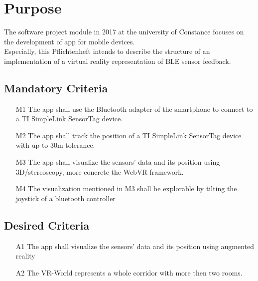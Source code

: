 \section{Purpose}
The software project module in 2017 at the university of Constance focuses on the development of app for mobile devices. \\
Especially, this Pflichtenheft intends to describe the structure of an implementation of a virtual reality representation of BLE sensor feedback.

\subsection{Mandatory Criteria}

\begin{itemize}
  \item[M1] The app shall use the Bluetooth adapter of the smartphone to connect to a TI SimpleLink SensorTag device.
  \item[M2] The app shall track the position of a TI SimpleLink SensorTag device with up to 30m tolerance.
  \item[M3] The app shall visualize the sensors' data and its position using 3D/stereoscopy, more concrete the WebVR framework.
  \item[M4] The visualization mentioned in M3 shall be explorable by tilting the joystick of a bluetooth controller
\end{itemize}

\subsection{Desired Criteria}

\begin{itemize}
  \item[A1] The app shall visualize the sensors' data and its position using augmented reality
  \item[A2] The VR-World represents a whole corridor with more then two rooms.
\end{itemize}
